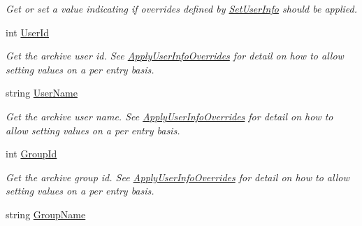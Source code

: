 \begin{DoxyCompactItemize}
\begin{DoxyCompactList}\small\item\em Get or set a value indicating if overrides defined by \hyperlink{class_i_c_sharp_code_1_1_sharp_zip_lib_1_1_tar_1_1_tar_archive_aa791e3eeee7dfc8aedd1a514f1bc08e0}{Set\+User\+Info} should be applied. \end{DoxyCompactList}\item 
int \hyperlink{class_i_c_sharp_code_1_1_sharp_zip_lib_1_1_tar_1_1_tar_archive_add3631b046124c266abd6dad9fe10635}{User\+Id}
\begin{DoxyCompactList}\small\item\em Get the archive user id. See \hyperlink{class_i_c_sharp_code_1_1_sharp_zip_lib_1_1_tar_1_1_tar_archive_a94d90eb52245f63a5ad06fb0289104ff}{Apply\+User\+Info\+Overrides} for detail on how to allow setting values on a per entry basis. \end{DoxyCompactList}\item 
string \hyperlink{class_i_c_sharp_code_1_1_sharp_zip_lib_1_1_tar_1_1_tar_archive_a8cca385887242221e11380267a8723c5}{User\+Name}
\begin{DoxyCompactList}\small\item\em Get the archive user name. See \hyperlink{class_i_c_sharp_code_1_1_sharp_zip_lib_1_1_tar_1_1_tar_archive_a94d90eb52245f63a5ad06fb0289104ff}{Apply\+User\+Info\+Overrides} for detail on how to allow setting values on a per entry basis. \end{DoxyCompactList}\item 
int \hyperlink{class_i_c_sharp_code_1_1_sharp_zip_lib_1_1_tar_1_1_tar_archive_a19f1b52f370508fcdc0785f3eb9202a8}{Group\+Id}
\begin{DoxyCompactList}\small\item\em Get the archive group id. See \hyperlink{class_i_c_sharp_code_1_1_sharp_zip_lib_1_1_tar_1_1_tar_archive_a94d90eb52245f63a5ad06fb0289104ff}{Apply\+User\+Info\+Overrides} for detail on how to allow setting values on a per entry basis. \end{DoxyCompactList}\item 
string \hyperlink{class_i_c_sharp_code_1_1_sharp_zip_lib_1_1_tar_1_1_tar_archive_a326999cdbcfc9285fd468e136d791809}{Group\+Name}

\end{DoxyCompactItemize}
